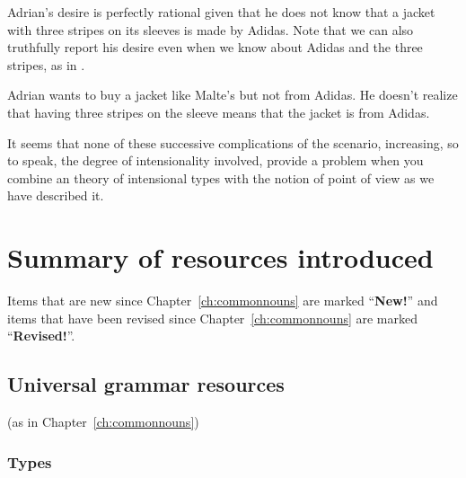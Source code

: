 Adrian's desire is perfectly rational given that he does not know that
a jacket with three stripes on its sleeves is made by Adidas.  Note
that we can also truthfully report his desire even when we know about
Adidas and the three stripes, as in \nexteg{}.
\begin{ex} 
Adrian wants to buy a jacket like Malte's but not from Adidas.  He
doesn't realize that having three stripes on the sleeve means that the
jacket is from Adidas. 
\end{ex} 

It seems that none of these successive complications of the scenario,
increasing, so to speak, the degree of intensionality involved,
provide a problem when you combine an theory of intensional types with
the notion of point of view as we have described it.

 
\section{Summary of resources introduced}
\label{sec:summresch6}


Items that are new since Chapter~\ref{ch:commonnouns} are marked
``\textbf{New!}'' and items that have been revised since
Chapter~\ref{ch:commonnouns} are marked ``\textbf{Revised!}''.  %

\subsection{Universal grammar resources} (as in Chapter~\ref{ch:commonnouns})

\subsubsection{Types} 

